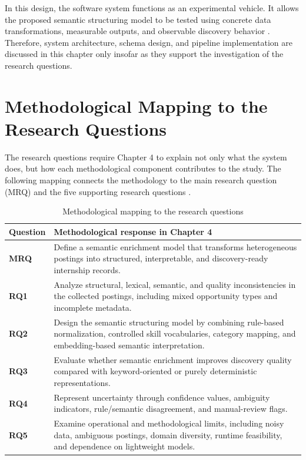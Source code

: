 In this design, the software system functions as an experimental vehicle. It allows the proposed semantic structuring model to be tested using concrete data transformations, measurable outputs, and observable discovery behavior \cite{hevner2004design, peffers2007design}. Therefore, system architecture, schema design, and pipeline implementation are discussed in this chapter only insofar as they support the investigation of the research questions.

\section{Methodological Mapping to the Research Questions}

The research questions require Chapter 4 to explain not only what the system does, but how each methodological component contributes to the study. The following mapping connects the methodology to the main research question (MRQ) and the five supporting research questions \cite{peffers2007design, wohlin2012experimentation}.

\begin{table}[H]
\centering
\caption{Methodological mapping to the research questions}
\label{tab:methodological-mapping-rqs}
\renewcommand{\arraystretch}{1.3}
\begin{tabular}{p{} p{}}
\hline
\textbf{Question} & \textbf{Methodological response in Chapter 4} \\
\hline

\textbf{MRQ} &
Define a semantic enrichment model that transforms heterogeneous postings into structured, interpretable, and discovery-ready internship records. \\

\textbf{RQ1} &
Analyze structural, lexical, semantic, and quality inconsistencies in the collected postings, including mixed opportunity types and incomplete metadata. \\

\textbf{RQ2} &
Design the semantic structuring model by combining rule-based normalization, controlled skill vocabularies, category mapping, and embedding-based semantic interpretation. \\

\textbf{RQ3} &
Evaluate whether semantic enrichment improves discovery quality compared with keyword-oriented or purely deterministic representations. \\

\textbf{RQ4} &
Represent uncertainty through confidence values, ambiguity indicators, rule/semantic disagreement, and manual-review flags. \\

\textbf{RQ5} &
Examine operational and methodological limits, including noisy data, ambiguous postings, domain diversity, runtime feasibility, and dependence on lightweight models. \\

\hline
\end{tabular}
\end{table}

